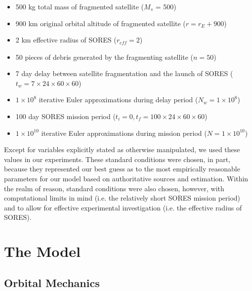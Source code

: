 \documentclass[12pt]{scrartcl}
\begin{document}
\begin{itemize}
    \item 500 kg total mass of fragmented satellite ($M_{s}$ = 500)\quad \cite{excel}
    \item 900 km original orbital altitude of fragmented satellite ($r = r_{E} + 900$) \quad \cite{ESA}
    \item 2 km effective radius of SORES ($r_{\mathit{eff}} = 2$)
    \item 50 pieces of debris generated by the fragmenting satellite ($n = 50$)\quad \cite{fragments}
    \item 7 day delay between satellite fragmentation and the launch of SORES ($t_{w} = 7 \times 24 \times 60 \times 60$)
    \item $1\times10^{8}$ iterative Euler approximations during delay period ($N_w = 1\times10^{8}$) 
    \item 100 day SORES mission period ($t_i = 0, t_f = 100 \times 24 \times 60 \times 60$)
    \item $1\times10^{10}$ iterative Euler approximations during mission period ($N = 1\times10^{10}$)
\end{itemize}

Except for variables explicitly stated as otherwise manipulated, we used these values in our experiments. These standard conditions were chosen, in part, because they represented our best guess as to the most empirically reasonable parameters for our model based on authoritative sources and estimation. Within the realm of reason, standard conditions were also chosen, however, with computational limits in mind (i.e. the relatively short SORES mission period) and to allow for effective experimental investigation (i.e. the effective radius of SORES).

\section{The Model} \label{sec:the_model}
\subsection{Orbital Mechanics}
\end{document}
